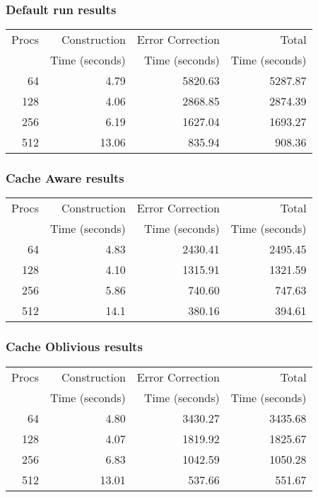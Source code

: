 \documentclass[integrals, nointegrals, article, 12pt, a4paper]{article}
\begin{document}
\subsubsection{Default run results}
\label{sec-3-3-2}

\begin{center}
\begin{tabular}{rrrr}
\hline
Procs & Construction & Error Correction & Total\\
 & Time (seconds) & Time (seconds) & Time (seconds)\\
\hline
64 & 4.79 & 5820.63 & 5287.87\\
128 & 4.06 & 2868.85 & 2874.39\\
256 & 6.19 & 1627.04 & 1693.27\\
512 & 13.06 & 835.94 & 908.36\\
\hline
\end{tabular}
\end{center}
\subsubsection{Cache Aware results}
\label{sec-3-3-3}

\begin{center}
\begin{tabular}{rrrr}
\hline
Procs & Construction & Error Correction & Total\\
 & Time (seconds) & Time (seconds) & Time (seconds)\\
\hline
64 & 4.83 & 2430.41 & 2495.45\\
128 & 4.10 & 1315.91 & 1321.59\\
256 & 5.86 & 740.60 & 747.63\\
512 & 14.1 & 380.16 & 394.61\\
\hline
\end{tabular}
\end{center}
\subsubsection{Cache Oblivious results}
\label{sec-3-3-4}

\begin{center}
\begin{tabular}{rrrr}
\hline
Procs & Construction & Error Correction & Total\\
 & Time (seconds) & Time (seconds) & Time (seconds)\\
\hline
64 & 4.80 & 3430.27 & 3435.68\\
128 & 4.07 & 1819.92 & 1825.67\\
256 & 6.83 & 1042.59 & 1050.28\\
512 & 13.01 & 537.66 & 551.67\\
\hline
\end{tabular}
\end{center}
\end{document}
